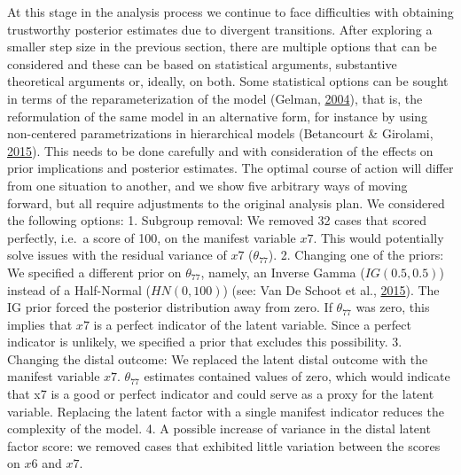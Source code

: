 \documentclass[openright,titlepage,12pt,a4paper]{book}
\begin{document}
At this stage in the analysis process we continue to face difficulties with obtaining trustworthy posterior estimates due to divergent transitions. After exploring a smaller step size in the previous section, there are multiple options that can be considered and these can be based on statistical arguments, substantive theoretical arguments or, ideally, on both. Some statistical options can be sought in terms of the reparameterization of the model (Gelman, \protect\hyperlink{ref-gelman_parameterization_2004}{2004}), that is, the reformulation of the same model in an alternative form, for instance by using non-centered parametrizations in hierarchical models (Betancourt \& Girolami, \protect\hyperlink{ref-betancourt_hamiltonian_2015}{2015}). This needs to be done carefully and with consideration of the effects on prior implications and posterior estimates. The optimal course of action will differ from one situation to another, and we show five arbitrary ways of moving forward, but all require adjustments to the original analysis plan. We considered the following options:
1. Subgroup removal: We removed 32 cases that scored perfectly, i.e.~a score of 100, on the manifest variable \(x7\). This would potentially solve issues with the residual variance of \(x7\) (\(\theta_{77}\)).
2. Changing one of the priors: We specified a different prior on \(\theta_{77}\), namely, an Inverse Gamma (\(IG(0.5,0.5)\)) instead of a Half-Normal (\(HN(0,100)\)) (see: Van De Schoot et al., \protect\hyperlink{ref-van_de_schoot_analyzing_2015}{2015}). The IG prior forced the posterior distribution away from zero. If \(\theta_{77}\) was zero, this implies that \(x7\) is a perfect indicator of the latent variable. Since a perfect indicator is unlikely, we specified a prior that excludes this possibility.
3. Changing the distal outcome: We replaced the latent distal outcome with the manifest variable \(x7\). \(\theta_{77}\) estimates contained values of zero, which would indicate that x7 is a good or perfect indicator and could serve as a proxy for the latent variable. Replacing the latent factor with a single manifest indicator reduces the complexity of the model.
4. A possible increase of variance in the distal latent factor score: we removed cases that exhibited little variation between the scores on \(x6\) and \(x7\).
\end{document}
